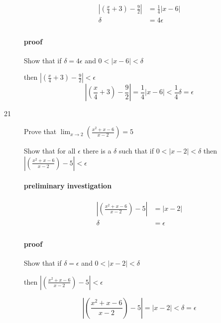 \documentclass[letterpaper, landscape]{exam}
\begin{document}
\begin{description}
        \begin{align*}
          \left| \left( \frac{x}{4} + 3 \right) - \frac{9}{2} \right| & = \frac{1}{4} |x - 6| \\
          \delta                                               & = 4 \epsilon \\
        \end{align*}

        \paragraph{proof}
        Show that if $\delta = 4 \epsilon$ and $0 < |x - 6| < \delta$

        then $\left| \left( \frac{x}{4} + 3 \right) - \frac{9}{2} \right| < \epsilon$
        \[
          \left| \left( \frac{x}{4} + 3 \right) - \frac{9}{2} \right| 
            = \frac{1}{4} |x - 6| < \frac{1}{4} \delta = \epsilon
        \]

      \item[21] Prove that $\lim_{x \to 2} \left( \frac{x^2 + x - 6}{x - 2} \right) = 5$

        Show that for all $\epsilon$ there is a $\delta$ such that if 
        $0 < |x - 2| < \delta$ then 
        $ \left| \left( \frac{x^2 + x - 6}{x - 2} \right) - 5 \right| < \epsilon$

        \paragraph{preliminary investigation}
        \begin{align*}
          \left| \left( \frac{x^2 + x - 6}{x - 2} \right) - 5 \right| & = |x - 2| \\
          \delta                                                      & = \epsilon \\
        \end{align*}

        \paragraph{proof}
        Show that if $\delta = \epsilon$ and $0 < |x - 2| < \delta$

        then $\left| \left( \frac{x^2 + x - 6}{x - 2} \right) - 5 \right| < \epsilon$

        \[
          \left| \left( \frac{x^2 + x - 6}{x - 2} \right) - 5 \right| = |x - 2| < \delta = \epsilon
        \]


\end{description}
\end{document}
